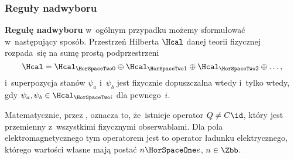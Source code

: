 \documentclass[10pt,t]{beamer}
\begin{document}
\begin{frame}
  \frametitle{Reguły nadwyboru}


  \textbf{Regułę nadwyboru} w~ogólnym przypadku możemy sformułować
  w~następujący sposób. Przestrzeń Hilberta $\Hcal$ danej teorii fizycznej
  rozpada~się na sumę prostą podprzestrzeni
  \begin{equation}
    \label{eq:Czym-sa-problemy-ETC-02}
    \Hcal =
    \Hcal_{ \HorSpaceTwo 0 } \oplus \Hcal_{ \HorSpaceTwo 1 } \oplus
    \Hcal_{ \HorSpaceTwo 2 } \oplus \ldots,
  \end{equation}
  i~superpozycja stanów $\psi_{ a }$ i~$\psi_{ b }$ jest fizycznie dopuszczalna
  wtedy i~tylko wtedy, gdy $\psi_{ a }, \psi_{ b } \in \Hcal_{ \HorSpaceTwo i }$
  dla pewnego~$i$.

  Matematycznie, przez
  ,
  oznacza to, że~istnieje operator $Q \neq C \id$, który jest przemienny
  z~wszystkimi fizycznymi obserwablami. Dla pola elektromagnetycznego tym
  operatorem jest to operator ładunku elektrycznego, którego wartości własne
  mają postać $n \HorSpaceOne e$, $n \in \Zbb$.

\end{frame}
\end{document}
